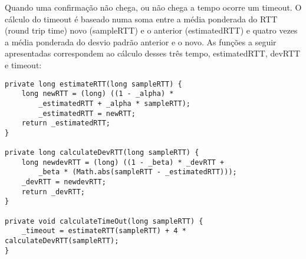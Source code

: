 \documentclass{llncs}
\begin{document}
Quando uma confirmação não chega, ou não chega a tempo ocorre um timeout. 
O cálculo do timeout é baseado numa soma entre a média ponderada do RTT (round trip time) novo (sampleRTT) e o anterior (estimatedRTT) e quatro vezes a média ponderada do desvio padrão anterior e o novo.
As funções a seguir apresentadas correspondem ao cálculo desses três tempo, estimatedRTT, devRTT e timeout:

\begin{lstlisting}
private long estimateRTT(long sampleRTT) {
	long newRTT = (long) ((1 - _alpha) * 
		_estimatedRTT + _alpha * sampleRTT);
		_estimatedRTT = newRTT;
	return _estimatedRTT;
}

private long calculateDevRTT(long sampleRTT) {
	long newdevRTT = (long) ((1 - _beta) * _devRTT + 
		_beta * (Math.abs(sampleRTT - _estimatedRTT)));
	_devRTT = newdevRTT;
	return _devRTT;
}

private void calculateTimeOut(long sampleRTT) {
	_timeout = estimateRTT(sampleRTT) + 4 * calculateDevRTT(sampleRTT);
}    
\end{lstlisting}


\end{document}
